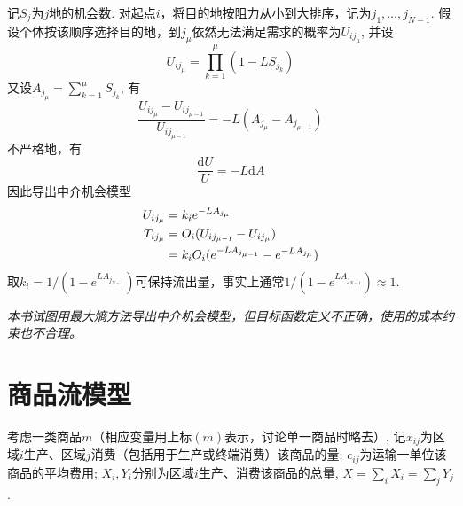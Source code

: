 \par 记$S_j$为$j$地的机会数. 对起点$i$，将目的地按阻力从小到大排序，记为$j_1,\dots,j_{N-1}$.  假设个体按该顺序选择目的地，到$j_\mu$依然无法满足需求的概率为$U_{ij_\mu}$, 并设
\begin{equation}
    U_{ij_\mu}= \prod_{k=1}^\mu (1-LS_{j_k})
\end{equation}
又设$A_{j_\mu}=\sum_{k=1}^\mu S_{j_k}$, 有
\begin{equation}
    \frac{U_{ij_\mu}-U_{ij_{\mu-1}}}{U_{ij_{\mu-1}}}=-L(A_{j_\mu}-A_{j_{\mu-1}})
\end{equation}
不严格地，有
\begin{equation}
    \frac{\mathrm{d}U}{U}=-L\mathrm{d}A
\end{equation}
因此导出中介机会模型
\begin{align}
    U_{ij_\mu}&=k_i e^{-LA_{j_\mu}}\\
    T_{ij_\mu}&=O_i(U_{ij_{\mu-1}}-U_{ij_\mu})\notag\\
    &=k_iO_i(e^{-LA_{j_{\mu-1}}}-e^{-LA_{j_\mu}})
\end{align}
取$k_i=1/(1-e^{LA_{j_{N-1}}})$可保持流出量，事实上通常$1/(1-e^{LA_{j_{N-1}}})\approx 1$.
\par \emph{本书试图用最大熵方法导出中介机会模型，但目标函数定义不正确，使用的成本约束也不合理。}

\section{商品流模型}

\par 考虑一类商品$m$（相应变量用上标$(m)$表示，讨论单一商品时略去）, 记$x_{ij}$为区域$i$生产、区域$j$消费（包括用于生产或终端消费）该商品的量; $c_{ij}$为运输一单位该商品的平均费用; $X_i, Y_i$分别为区域$i$生产、消费该商品的总量, $X=\sum_i X_i=\sum_j Y_j$. 


